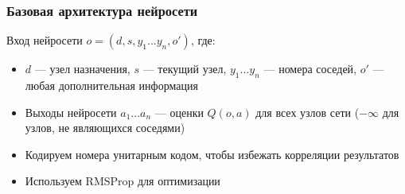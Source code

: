 \documentclass{beamer}
\begin{document}

\begin{frame}
  \frametitle{Базовая архитектура нейросети}
  Вход нейросети $o = (d, s, y_1 ... y_n, o')$, где:
  \begin{itemize}
  \item $d$ --- узел назначения, $s$ --- текущий узел, $y_1 ... y_n$ --- номера
    соседей, $o'$ --- любая дополнительная информация
  \item Выходы нейросети $a_1 ... a_n$ --- оценки $Q(o, a)$ для всех узлов сети
    ($-\infty$ для узлов, не являющихся соседями)
  \item Кодируем номера унитарным кодом, чтобы избежать корреляции результатов
  \item Используем RMSProp для оптимизации
  \end{itemize}
\end{frame}

\end{document}
